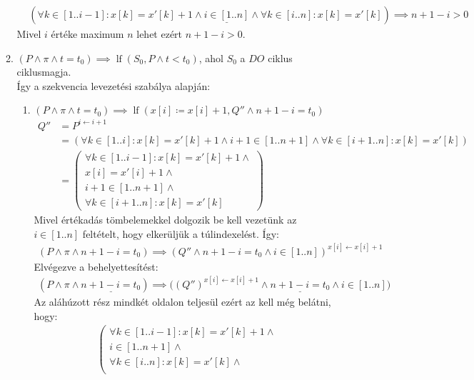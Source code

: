\documentclass[a4paper,12pt]{article}
\DeclareMathOperator{\lf}{lf}
\begin{document}
\begin{solution}
\begin{enumerate}
\begin{enumerate}
\begin{align*}
					&( \forall k \in [1..i-1]: x[k] = x'[k] + 1 \land \underline{ i \in [1..n] } \land \forall k \in [i..n]: x[k] = x'[k] ) \implies n + 1 - i > 0
				\end{align*}
				Mivel $i$ értéke maximum $n$ lehet ezért $ n + 1 - i > 0 $.
				\item $(P \land \pi \land t = t_0) \implies \lf (S_0, P \land t<t_0) $, ahol $S_0$ a $DO$ ciklus ciklusmagja. \\ Így a szekvencia levezetési szabálya alapján:
				\begin{enumerate}
					\item $ (P \land \pi \land t = t_0) \implies \lf(x[i] \coloneq x[i] + 1, Q'' \land n + 1 - i = t_0) $
					\begin{align*}
						Q'' &= P^{i \leftarrow i + 1} \\
						&= \left( \forall k \in [1..i]: x[k] = x'[k] + 1 \land i+1 \in [1..n+1] \land \forall k \in [i+1..n]: x[k] = x'[k] \right) \\
						&= \left( \begin{array}{l}
							\forall k \in [1..i-1]: x[k] = x'[k] + 1 \land \\ x[i] = x'[i] + 1 \land \\ i+1 \in [1..n+1] \land \\ \forall k \in [i+1..n]: x[k] = x'[k]
						\end{array} \right)
					\end{align*}
					Mivel értékadás tömbelemekkel dolgozik be kell vezetünk az $ i \in [1..n] $ feltételt, hogy elkerüljük a túlindexelést. Így:
					\begin{align*}
						(P \land \pi \land n + 1 - i = t_0) \implies (Q'' \land n + 1 - i = t_0 \land i \in [1..n])^{x[i] \leftarrow x[i] + 1}
					\end{align*}
					Elvégezve a behelyettesítést:
					\begin{align*}
						(P \land \pi \land \underline{ n + 1 - i = t_0 }) \implies \bigl( (Q'')^{x[i] \leftarrow x[i] + 1} \land \underline{n + 1 - i = t_0 } \land i \in [1..n] \bigr)
					\end{align*}
					Az aláhúzott rész mindkét oldalon teljesül ezért az kell még belátni, hogy:
					\begin{align*}
						\left( \begin{array}{l}
							\forall k \in [1..i-1]: x[k] = x'[k] + 1 \land \\
							i \in [1..n+1] \land \\
							\forall k \in [i..n]: x[k] = x'[k] \land \\

\end{array}
\end{align*}
\end{enumerate}
\end{enumerate}
\end{enumerate}
\end{solution}
\end{document}
